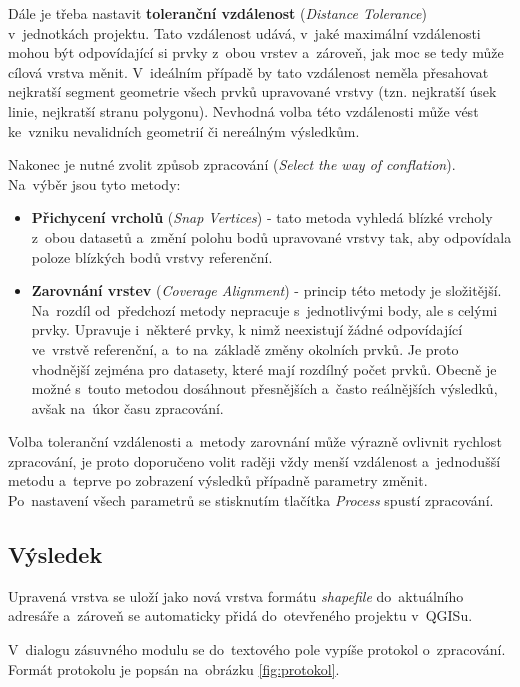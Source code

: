 Dále je třeba nastavit \textbf{toleranční vzdálenost} (\textit{Distance 
Tolerance}) v~jednotkách projektu. Tato vzdálenost udává, v~jaké maximální 
vzdálenosti mohou být odpovídající si prvky z~obou vrstev a~zároveň, jak 
moc se tedy může cílová vrstva měnit. V~ideálním případě by tato vzdálenost 
neměla přesahovat nejkratší segment geometrie všech prvků upravované vrstvy 
(tzn. nejkratší úsek linie, nejkratší stranu polygonu). Nevhodná volba této 
vzdálenosti může vést ke~vzniku nevalidních geometrií či nereálným výsledkům.

Nakonec je nutné zvolit způsob zpracování (\textit{Select the way of conflation}). 
Na~výběr jsou tyto metody:
\begin{itemize}
 \item \textbf{Přichycení vrcholů} (\textit{Snap Vertices}) - tato metoda vyhledá 
	blízké vrcholy z~obou datasetů a~změní polohu bodů upravované vrstvy tak, 
	aby odpovídala poloze blízkých bodů vrstvy referenční.
 \item \textbf{Zarovnání vrstev} (\textit{Coverage Alignment}) - princip této 
	metody je složitější. Na~rozdíl od~předchozí metody nepracuje s~jednotlivými
	body, ale s celými prvky. Upravuje i~některé prvky, k nimž neexistují 
	žádné odpovídající ve~vrstvě refe\-renční, a~to na~základě změny okolních 
	prvků. Je proto vhodnější zejména pro datasety, které mají rozdílný počet
	prvků. Obecně je možné s~touto metodou dosáhnout přesnějších a~často
	reálnějších výsledků, avšak na~úkor času zpraco\-vání.
\end{itemize}

Volba toleranční vzdálenosti a~metody zarovnání může výrazně ovlivnit rychlost 
zpracování, je proto doporučeno volit raději vždy menší vzdálenost a~jednodušší
metodu a~teprve po zobrazení výsledků případně parametry změnit. Po~nastavení 
všech parametrů se stisknutím tlačítka \textit{Process} spustí zpracování. 


\subsection{Výsledek}
\label{prirucka-vysledek}

Upravená vrstva se uloží jako nová vrstva formátu \textit{shapefile} do~aktuálního 
adresáře a~zároveň se automaticky přidá do~otevřeného projektu v~QGISu.

V~dialogu zásuvného modulu se do~textového pole vypíše protokol o~zpracování.
Formát protokolu je popsán na~obrázku \ref{fig:protokol}.  

